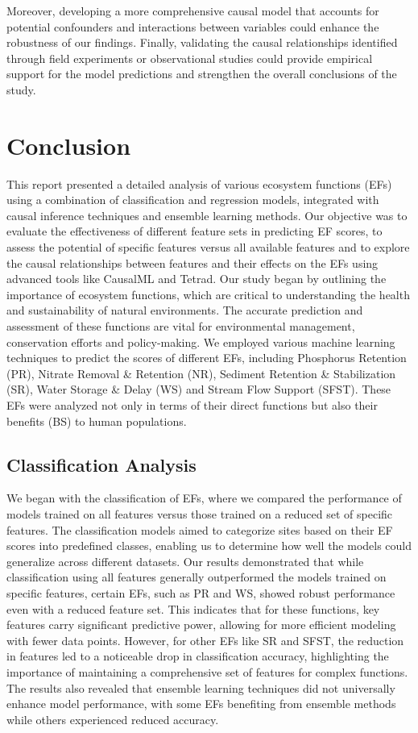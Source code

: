 \documentclass[12pt,letterpaper]{article}
\begin{document}
Moreover, developing a more comprehensive causal model that accounts for potential confounders and interactions between variables could enhance the robustness of our findings.
Finally, validating the causal relationships identified through field experiments or observational studies could provide empirical support for the model predictions and strengthen the overall conclusions of the study.


\section{Conclusion}
This report presented a detailed analysis of various ecosystem functions (\acp{EF}) using a combination of classification and regression models, integrated with causal inference techniques and ensemble learning methods.
Our objective was to evaluate the effectiveness of different feature sets in predicting \ac{EF} scores, to assess the potential of specific features versus all available features and to explore the causal relationships between features and their effects on the \acp{EF} using advanced tools like CausalML and Tetrad.
Our study began by outlining the importance of ecosystem functions, which are critical to understanding the health and sustainability of natural environments.
The accurate prediction and assessment of these functions are vital for environmental management, conservation efforts and policy-making.
We employed various machine learning techniques to predict the scores of different \acp{EF}, including Phosphorus Retention (\ac{PR}), Nitrate Removal \& Retention (\ac{NR}), Sediment Retention \& Stabilization (\ac{SR}), Water Storage \& Delay (\ac{WS}) and Stream Flow Support (\ac{SFST}).
These \acp{EF} were analyzed not only in terms of their direct functions but also their benefits (\ac{BS}) to human populations.

\subsection{Classification Analysis}
We began with the classification of \acp{EF}, where we compared the performance of models trained on all features versus those trained on a reduced set of specific features.
The classification models aimed to categorize sites based on their \ac{EF} scores into predefined classes, enabling us to determine how well the models could generalize across different datasets.
Our results demonstrated that while classification using all features generally outperformed the models trained on specific features, certain \acp{EF}, such as \ac{PR} and \ac{WS}, showed robust performance even with a reduced feature set.
This indicates that for these functions, key features carry significant predictive power, allowing for more efficient modeling with fewer data points.
However, for other \acp{EF} like \ac{SR} and \ac{SFST}, the reduction in features led to a noticeable drop in classification accuracy, highlighting the importance of maintaining a comprehensive set of features for complex functions.
The results also revealed that ensemble learning techniques did not universally enhance model performance, with some \acp{EF} benefiting from ensemble methods while others experienced reduced accuracy.
\end{document}
